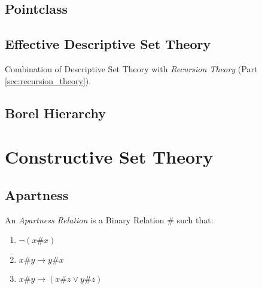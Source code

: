 \subsection{Pointclass}\label{sec:pointclass}

\subsection{Effective Descriptive Set Theory}
\label{sec:effective_descriptive}

Combination of Descriptive Set Theory with \emph{Recursion Theory}
(Part \ref{sec:recursion_theory}).

\subsection{Borel Hierarchy}\label{sec:borel_hierarchy}



\section{Constructive Set Theory}\label{sec:constructive_set_theory}

\subsection{Apartness}\label{sec:apartness}

An \emph{Apartness Relation} is a Binary Relation $\#$ such that:

\begin{enumerate}
\item $\neg (x\#x)$
\item $x\#y \rightarrow y\#x$
\item $x\#y \rightarrow (x\#z \vee y\#z)$
\end{enumerate}

